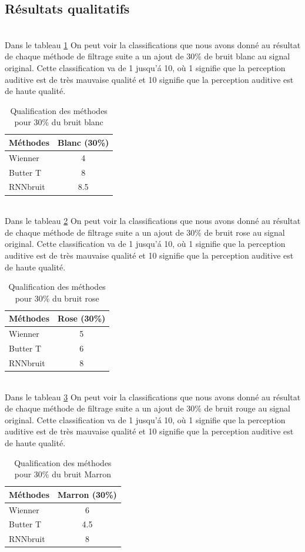 \documentclass[conference,onecolumn]{IEEEtran}
\begin{document}
\subsection{Résultats qualitatifs}
\hfill \\
Dans le tableau \ref{table:t4} On peut voir la classifications que nous avons donné au résultat de chaque méthode de filtrage suite a un ajout de 30\% de bruit blanc au signal original. Cette classification va de 1 jusqu'á 10, où 1 signifie que la perception auditive est de très mauvaise qualité et 10 signifie que la perception auditive est de haute qualité.
\begin{table}[hbt!]
    \centering
    \begin{tabular}{ l  c }
    \textbf{Méthodes} & \textbf{Blanc (30\%)} \\
    \hline
    Wienner &  4\\
    Butter T &  8 \\
    RNNbruit &  8.5 \\
    \end{tabular}
    \caption{Qualification des méthodes pour 30\% du bruit blanc}
    \label{table:t4}
\end{table}
\hfill \\
Dans le tableau \ref{table:t5} On peut voir la classifications que nous avons donné au résultat de chaque méthode de filtrage suite a un ajout de 30\% de bruit rose au signal original. Cette classification va de 1 jusqu'á 10, où 1 signifie que la perception auditive est de très mauvaise qualité et 10 signifie que la perception auditive est de haute qualité.  
\begin{table}[hbt!]
    \centering
    \begin{tabular}{ l  c }
    \textbf{Méthodes} & \textbf{Rose (30\%)} \\
    \hline
    Wienner & 5 \\
    Butter T &  6 \\
    RNNbruit &  8 \\
    \end{tabular}
    \caption{Qualification des méthodes pour 30\% du bruit rose}
    \label{table:t5}
\end{table}
\hfill \\
Dans le tableau \ref{table:t6} On peut voir la classifications que nous avons donné au résultat de chaque méthode de filtrage suite a un ajout de 30\% de bruit rouge au signal original. Cette classification va de 1 jusqu'á 10, où 1 signifie que la perception auditive est de très mauvaise qualité et 10 signifie que la perception auditive est de haute qualité.
\begin{table}[hbt!]
    \centering
    \begin{tabular}{ l  c }
    \textbf{Méthodes} & \textbf{Marron (30\%)} \\
    \hline
    Wienner & 6  \\
    Butter T &  4.5 \\
    RNNbruit & 8 \\
    \end{tabular}
    \caption{Qualification des méthodes pour 30\% du bruit Marron}
    \label{table:t6}
\end{table}
\hfill \\
\end{document}
